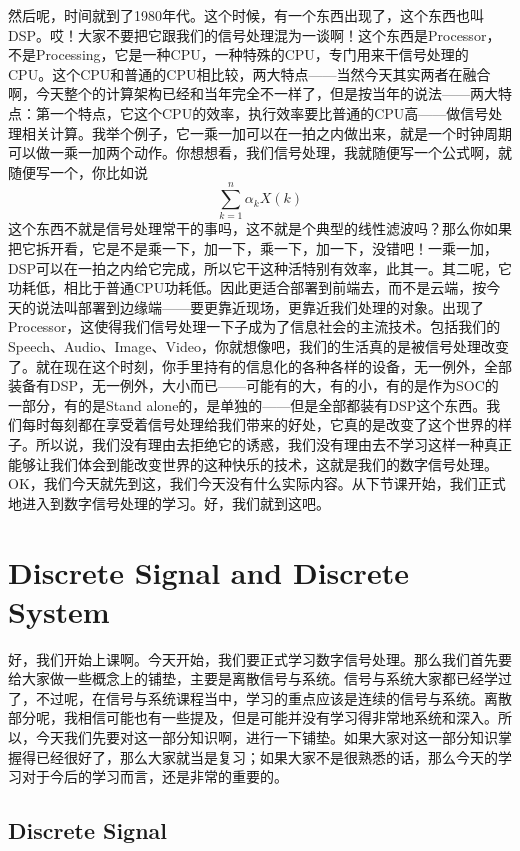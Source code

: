 \documentclass[a4paper,12pt]{article}
\begin{document}
然后呢，时间就到了1980年代。这个时候，有一个东西出现了，这个东西也叫DSP。哎！大家不要把它跟我们的信号处理混为一谈啊！这个东西是Processor，不是Processing，它是一种CPU，一种特殊的CPU，专门用来干信号处理的CPU。这个CPU和普通的CPU相比较，两大特点——当然今天其实两者在融合啊，今天整个的计算架构已经和当年完全不一样了，但是按当年的说法——两大特点：第一个特点，它这个CPU的效率，执行效率要比普通的CPU高——做信号处理相关计算。我举个例子，它一乘一加可以在一拍之内做出来，就是一个时钟周期可以做一乘一加两个动作。你想想看，我们信号处理，我就随便写一个公式啊，就随便写一个，你比如说
\begin{equation}
    \sum_{k=1}^n \alpha_k X(k) 
\end{equation}
这个东西不就是信号处理常干的事吗，这不就是个典型的线性滤波吗？那么你如果把它拆开看，它是不是乘一下，加一下，乘一下，加一下，没错吧！一乘一加，DSP可以在一拍之内给它完成，所以它干这种活特别有效率，此其一。其二呢，它功耗低，相比于普通CPU功耗低。因此更适合部署到前端去，而不是云端，按今天的说法叫部署到边缘端——要更靠近现场，更靠近我们处理的对象。出现了Processor，这使得我们信号处理一下子成为了信息社会的主流技术。包括我们的Speech、Audio、Image、Video，你就想像吧，我们的生活真的是被信号处理改变了。就在现在这个时刻，你手里持有的信息化的各种各样的设备，无一例外，全部装备有DSP，无一例外，大小而已——可能有的大，有的小，有的是作为SOC的一部分，有的是Stand alone的，是单独的——但是全部都装有DSP这个东西。我们每时每刻都在享受着信号处理给我们带来的好处，它真的是改变了这个世界的样子。所以说，我们没有理由去拒绝它的诱惑，我们没有理由去不学习这样一种真正能够让我们体会到能改变世界的这种快乐的技术，这就是我们的数字信号处理。OK，我们今天就先到这，我们今天没有什么实际内容。从下节课开始，我们正式地进入到数字信号处理的学习。好，我们就到这吧。

\newpage
\section{Discrete Signal and Discrete System \uppercase\expandafter{}}\quad

好，我们开始上课啊。今天开始，我们要正式学习数字信号处理。那么我们首先要给大家做一些概念上的铺垫，主要是离散信号与系统。信号与系统大家都已经学过了，不过呢，在信号与系统课程当中，学习的重点应该是连续的信号与系统。离散部分呢，我相信可能也有一些提及，但是可能并没有学习得非常地系统和深入。所以，今天我们先要对这一部分知识啊，进行一下铺垫。如果大家对这一部分知识掌握得已经很好了，那么大家就当是复习；如果大家不是很熟悉的话，那么今天的学习对于今后的学习而言，还是非常的重要的。

\subsection{Discrete Signal}\quad
\end{document}
